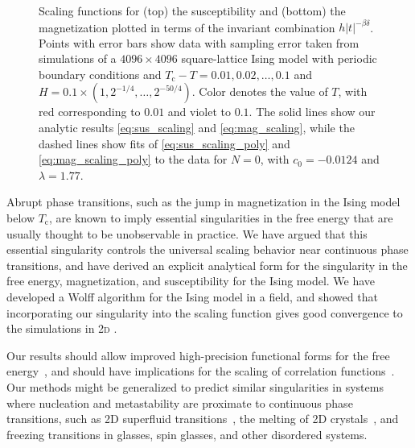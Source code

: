 \documentclass[aps,prl,reprint]{revtex4-1}
\def\c{\mathrm c}
\def\twodee{\textsc{2d} }
\begin{document}
\begin{figure}
  
  \caption{
    Scaling functions for (top) the susceptibility and (bottom) the
    magnetization plotted in terms of the invariant combination
    $h|t|^{-\beta\delta}$. Points with error bars show data with sampling
    error taken from simulations of a $4096\times4096$ square-lattice Ising
    model with periodic boundary conditions and $T_\c-T=0.01,0.02,\ldots,0.1$
    and $H=0.1\times(1,2^{-1/4},\ldots,2^{-50/4})$. Color denotes the value of
    $T$, with red corresponding to $0.01$ and violet to $0.1$. The solid lines
    show our analytic results \eqref{eq:sus_scaling} and
    \eqref{eq:mag_scaling}, while the dashed lines show fits of
    \eqref{eq:sus_scaling_poly} and \eqref{eq:mag_scaling_poly} to the data
    for $N=0$, with $c_0=-0.0124$ and $\lambda=1.77$.
  }
  \label{fig:scaling_fits}
\end{figure}

Abrupt phase transitions, such as the jump in magnetization in the Ising
model below $T_\c$, are known to imply essential singularities in the free
energy that are usually thought to be unobservable in practice. We have
argued that this essential singularity controls the universal scaling
behavior near continuous phase transitions, and have derived an explicit
analytical form for the singularity in the free energy, magnetization,
and susceptibility for the Ising model. We have developed a Wolff algorithm 
for the Ising model in a field, and showed that incorporating our singularity
into the scaling function gives good convergence to the simulations in \twodee.

Our results should allow improved high-precision functional forms for the free
energy~\cite{caselle.2001.critical}, and should have implications for the scaling
of correlation functions~\cite{YJXXX,XXX}. Our methods might be generalized
to predict similar singularities in systems where nucleation and metastability
are proximate to continuous phase transitions, such as 2D superfluid
transitions~\cite{ALHN}, the melting of 2D crystals~\cite{XXX}, and
freezing transitions in glasses, spin glasses, and other disordered systems.


\end{document}
